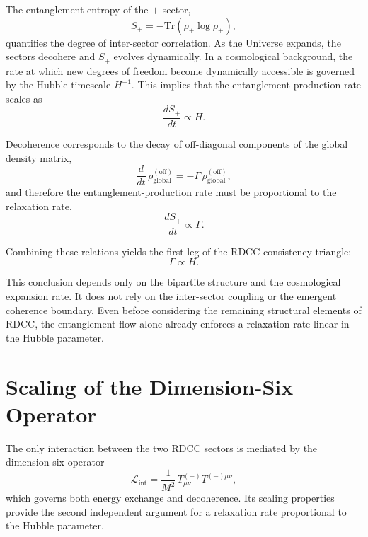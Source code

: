\documentclass[11pt,a4paper]{article}
\begin{document}
The entanglement entropy of the $+$ sector,
\begin{equation}
    S_{+} = - \mathrm{Tr}\!\left( \rho_{+} \log \rho_{+} \right),
\end{equation}
quantifies the degree of inter-sector correlation. As the Universe expands, the sectors
decohere and $S_{+}$ evolves dynamically. In a cosmological background, the rate at
which new degrees of freedom become dynamically accessible is governed by the
Hubble timescale $H^{-1}$. This implies that the entanglement-production rate scales as
\begin{equation}
    \frac{dS_{+}}{dt} \propto H.
\end{equation}

Decoherence corresponds to the decay of off-diagonal components of the global density
matrix,
\begin{equation}
    \frac{d}{dt}\,\rho_{\mathrm{global}}^{\mathrm{(off)}} 
    = -\Gamma\, \rho_{\mathrm{global}}^{\mathrm{(off)}},
\end{equation}
and therefore the entanglement-production rate must be proportional to the relaxation
rate,
\begin{equation}
    \frac{dS_{+}}{dt} \propto \Gamma.
\end{equation}

Combining these relations yields the first leg of the RDCC consistency triangle:
\begin{equation}
    \Gamma \propto H.
\end{equation}

This conclusion depends only on the bipartite structure and the cosmological expansion
rate. It does not rely on the inter-sector coupling or the emergent coherence boundary.
Even before considering the remaining structural elements of RDCC, the entanglement
flow alone already enforces a relaxation rate linear in the Hubble parameter.

\section{Scaling of the Dimension-Six Operator}

The only interaction between the two RDCC sectors is mediated by the dimension-six
operator
\begin{equation}
    \mathcal{L}_{\mathrm{int}}
    = \frac{1}{M^{2}}\, T^{(+)}_{\mu\nu} T^{(-)\mu\nu},
\end{equation}
which governs both energy exchange and decoherence. Its scaling properties provide the
second independent argument for a relaxation rate proportional to the Hubble parameter.
\end{document}
